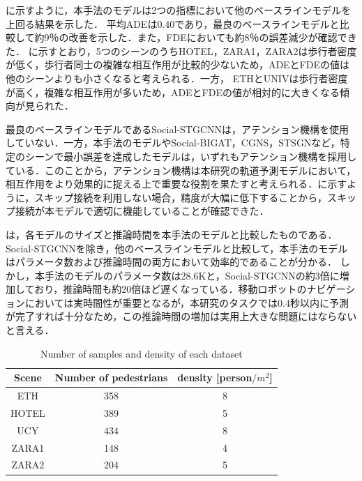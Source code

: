 \protect{}

に示すように，本手法のモデルは2つの指標において他のベースラインモデルを上回る結果を示した．
平均ADEは0.40であり，最良のベースラインモデルと比較して約9％の改善を示した．また，FDEにおいても約8％の誤差減少が確認できた．
に示すとおり，5つのシーンのうちHOTEL，ZARA1，ZARA2は歩行者密度が低く，歩行者同士の複雑な相互作用が比較的少ないため，ADEとFDEの値は他のシーンよりも小さくなると考えられる．一方，
ETHとUNIVは歩行者密度が高く，複雑な相互作用が多いため，ADEとFDEの値が相対的に大きくなる傾向が見られた．


最良のベースラインモデルであるSocial-STGCNNは，アテンション機構を使用していない．一方，本手法のモデルやSocial-BIGAT，CGNS，STSGNなど，特定のシーンで最小誤差を達成したモデルは，いずれもアテンション機構を採用している．このことから，アテンション機構は本研究の軌道予測モデルにおいて，相互作用をより効果的に捉える上で重要な役割を果たすと考えられる．に示すように，スキップ接続を利用しない場合，精度が大幅に低下することから，スキップ接続が本モデルで適切に機能していることが確認できた．

\newpage

は，各モデルのサイズと推論時間を本手法のモデルと比較したものである．
Social-STGCNN\cite{s-stgcnn}を除き，他のベースラインモデルと比較して，本手法のモデルはパラメータ数および推論時間の両方において効率的であることが分かる．
しかし，本手法のモデルのパラメータ数は28.6Kと，Social-STGCNNの約3倍に増加しており，推論時間も約20倍ほど遅くなっている．移動ロボットのナビゲーションにおいては実時間性が重要となるが，本研究のタスクでは0.4秒以内に予測が完了すれば十分なため，この推論時間の増加は実用上大きな問題にはならないと言える．

\begin{table}[hbtp]
  \begin{center}
  \caption{Number of samples and density of each dataset\protect\footnotemark[7]}
  \label{tab:density}
  \begin{tabular}{c||c|c}
  Scene & Number of pedestrians & density [person$/ m^2$] \\ 
  \hline \hline
  ETH      & 358       & 8                      \\
  \hline
  HOTEL    & 389       & 5                      \\
  \hline
  UCY      & 434       & 8                      \\
  \hline
  ZARA1   & 148       & 4                      \\
  \hline
  ZARA2   & 204       & 5                      \\
  \hline
  \end{tabular}
  \end{center}
\end{table}

